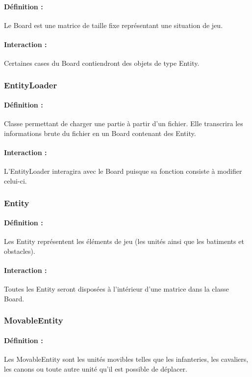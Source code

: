 \documentclass[12pt]{article}
\begin{document}
				\paragraph{Définition :}
				Le Board est une matrice de taille fixe représentant une situation de jeu.
				\paragraph{Interaction :}
				Certaines cases du Board contiendront des objets de type Entity.
				

			\subsubsection{EntityLoader}

				\paragraph{Définition :}
				Classe permettant de charger une partie à partir d'un fichier. Elle transcrira les informations brute du 
				fichier en un Board contenant des Entity.
				\paragraph{Interaction :}
				L'EntityLoader interagira avec le Board puisque sa fonction consiste à modifier celui-ci.

			\subsubsection{Entity}

				\paragraph{Définition :}
				Les Entity représentent les éléments de jeu (les unités ainsi que les batiments et obstacles).
				\paragraph{Interaction :}
				Toutes les Entity seront disposées à l'intérieur d'une matrice dans la classe Board.

			\subsubsection{MovableEntity}

				\paragraph{Définition :}
				Les MovableEntity sont les unités movibles telles que les infanteries, les cavaliers, les canons ou toute autre unité 
				qu'il est possible de déplacer.
\end{document}
